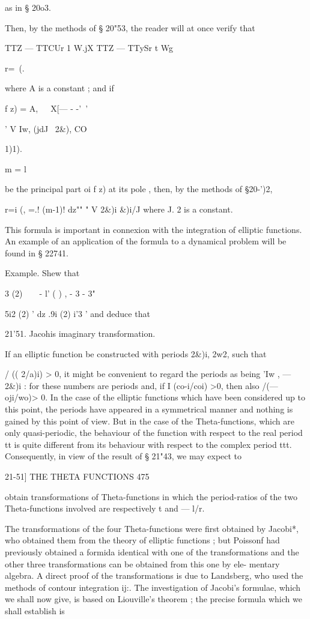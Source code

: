 as in § 20o3.

Then, by the methods of § 20"53, the reader will at once verify that

TTZ — TTCUr 1 W.jX TTZ — TTySr t Wg

r=\ (.

where A is a constant ; and if



f z) = A,\ \ \ X[— - -'~' \ \ %

' V Iw, (jdJ \ 2\&), CO



1)1).

m = l

be the principal part oi f z) at its pole , then, by the methods of
§20-')2,

r=i (, =.! (m-1)! dz"" " V 2\&)i \&)i/J where J. 2 is a constant.

This formula is important in connexion with the integration of
elliptic functions. An example of an application of the formula to a
dynamical problem will be found in § 22741.

Example. Shew that

  3 (2)\ \ \ \ - l' ( ) , - 3 - 3"

5i2 (2) ' dz .9i (2) i'3 ' and deduce that

21'51. Jacohis imaginary transformation.

If an elliptic function be constructed with periods 2\&)i, 2w2, such
that

/ (( 2/a)i) > 0, it might be convenient to regard the periods as being
'Iw , — 2\&)i : for these numbers are periods and, if I (co-i/coi) >0,
then also /(— oji/wo)> 0. In the case of the elliptic functions which
have been considered up to this point, the periods have appeared in a
symmetrical manner and nothing is gained by this point of view. But in
the case of the Theta-functions, which are only quasi-periodic, the
behaviour of the function with respect to the real period tt is quite
different from its behaviour with respect to the complex period ttt.
Consequently, in view of the result of § 21"43, we may expect to



21-51] THE THETA FUNCTIONS 475

obtain transformations of Theta-functions in which the period-ratios
of the two Theta-functions involved are respectively t and — l/r.

The transformations of the four Theta-functions were first obtained by
Jacobi*, who obtained them from the theory of elliptic functions ; but
Poissonf had previously obtained a formida identical with one of the
transformations and the other three transformations can be obtained
from this one by ele- mentary algebra. A direct proof of the
transformations is due to Landsberg, who used the methods of contour
integration ij:. The investigation of Jacobi's formulae, which we
shall now give, is based on Liouville's theorem ; the precise formula
which we shall establish is

